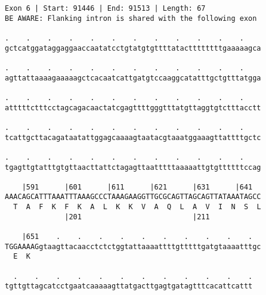 \documentclass{article}
\begin{document}
\newpage
\begin{Verbatim}[fontfamily=courier]
Exon 6 | Start: 91446 | End: 91513 | Length: 67
BE AWARE: Flanking intron is shared with the following exon

.    .    .    .    .    .    .    .    .    .    .    .    
gctcatggataggaggaaccaatatcctgtatgtgttttatacttttttttgaaaaagca

.    .    .    .    .    .    .    .    .    .    .    .    
agttattaaaagaaaaagctcacaatcattgatgtccaaggcatatttgctgtttatgga

.    .    .    .    .    .    .    .    .    .    .    .    
atttttctttcctagcagacaactatcgagttttgggtttatgttaggtgtctttacctt

.    .    .    .    .    .    .    .    .    .    .    .    
tcattgcttacagataatattggagcaaaagtaatacgtaaatggaaagttattttgctc

.    .    .    .    .    .    .    .    .    .    .    .    
tgagttgtatttgtgttaacttattctagagttaatttttaaaaattgtgttttttccag

    |591      |601      |611      |621      |631      |641  
AAACAGCATTTAAATTTAAAGCCCTAAAGAAGGTTGCGCAGTTAGCAGTTATAAATAGCC
  T  A  F  K  F  K  A  L  K  K  V  A  Q  L  A  V  I  N  S  L
              |201                          |211            

    |651    .    .    .    .    .    .    .    .    .    .  
TGGAAAAGgtaagttacaacctctctggtattaaaattttgtttttgatgtaaaatttgc
  E  K                                                      

  .    .    .    .    .    .    .    .    .    .    .    .
tgttgttagcatcctgaatcaaaaagttatgacttgagtgatagtttcacattcattt
\end{Verbatim}
\newpage
\end{document}
